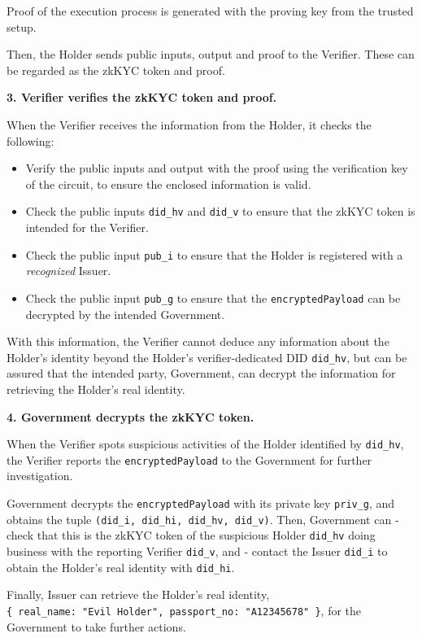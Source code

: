\documentclass[
]{report}
\providecommand{\tightlist}{%
  \setlength{\itemsep}{0pt}\setlength{\parskip}{0pt}}
\begin{document}
Proof of the execution process is generated with the proving key from
the trusted setup.

Then, the Holder sends public inputs, output and proof to the Verifier.
These can be regarded as the zkKYC token and proof.

\textbf{3. Verifier verifies the zkKYC token and proof.}

When the Verifier receives the information from the Holder, it checks
the following:

\begin{itemize}
\tightlist
\item
  Verify the public inputs and output with the proof using the
  verification key of the circuit, to ensure the enclosed information is
  valid.
\item
  Check the public inputs \texttt{did\_hv} and \texttt{did\_v} to ensure
  that the zkKYC token is intended for the Verifier.
\item
  Check the public input \texttt{pub\_i} to ensure that the Holder is
  registered with a \emph{recognized} Issuer.
\item
  Check the public input \texttt{pub\_g} to ensure that the
  \texttt{encryptedPayload} can be decrypted by the intended Government.
\end{itemize}

With this information, the Verifier cannot deduce any information about
the Holder's identity beyond the Holder's verifier-dedicated DID
\texttt{did\_hv}, but can be assured that the intended party,
Government, can decrypt the information for retrieving the Holder's real
identity.

\textbf{4. Government decrypts the zkKYC token.}

When the Verifier spots suspicious activities of the Holder identified
by \texttt{did\_hv}, the Verifier reports the \texttt{encryptedPayload}
to the Government for further investigation.

Government decrypts the \texttt{encryptedPayload} with its private key
\texttt{priv\_g}, and obtains the tuple
\texttt{(did\_i,\ did\_hi,\ did\_hv,\ did\_v)}. Then, Government can -
check that this is the zkKYC token of the suspicious Holder
\texttt{did\_hv} doing business with the reporting Verifier
\texttt{did\_v}, and - contact the Issuer \texttt{did\_i} to obtain the
Holder's real identity with \texttt{did\_hi}.

Finally, Issuer can retrieve the Holder's real identity,
\texttt{\{\ real\_name:\ "Evil\ Holder",\ passport\_no:\ "A12345678"\ \}},
for the Government to take further actions.
\end{document}
